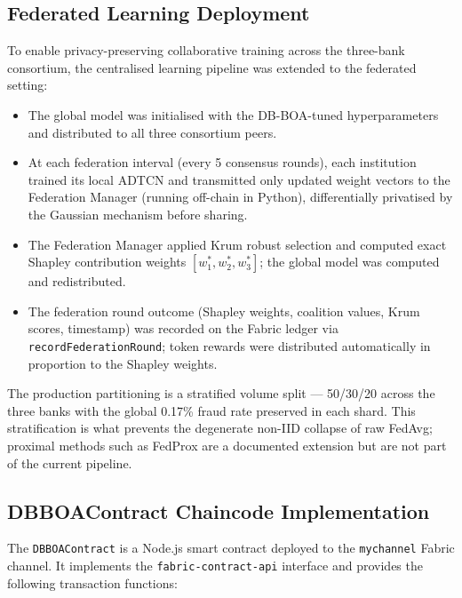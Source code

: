 \subsection*{Federated Learning Deployment}

To enable privacy-preserving collaborative training across the three-bank consortium, the centralised learning pipeline was extended to the federated setting:

\begin{itemize}
    \item The global model was initialised with the DB-BOA-tuned hyperparameters and distributed to all three consortium peers.
    \item At each federation interval (every 5 consensus rounds), each institution trained its local ADTCN and transmitted only updated weight vectors to the Federation Manager (running off-chain in Python), differentially privatised by the Gaussian mechanism before sharing.
    \item The Federation Manager applied Krum robust selection and computed exact Shapley contribution weights $[w_1^\ast, w_2^\ast, w_3^\ast]$; the global model was computed and redistributed.
    \item The federation round outcome (Shapley weights, coalition values, Krum scores, timestamp) was recorded on the Fabric ledger via \texttt{recordFederationRound}; token rewards were distributed automatically in proportion to the Shapley weights.
\end{itemize}

The production partitioning is a stratified volume split — 50/30/20 across the three banks with the global 0.17\% fraud rate preserved in each shard. This stratification is what prevents the degenerate non-IID collapse of raw FedAvg; proximal methods such as FedProx are a documented extension but are not part of the current pipeline.

\subsection*{DBBOAContract Chaincode Implementation}

The \texttt{DBBOAContract} is a Node.js smart contract deployed to the \texttt{mychannel} Fabric channel. It implements the \texttt{fabric-contract-api} interface and provides the following transaction functions:

